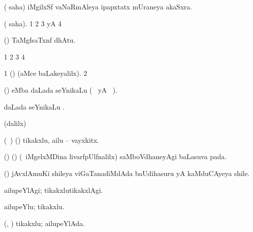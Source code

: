 \bentry
{} 
\gl{\nA}
\bmng
( saha) iMgilxSf vaNaRmAleya ipapxtatx mUraneya akaSxra. 
\emng
\eentry

\bentry
{}
\gl{\saMkiSx}
\expl{}
\bmng
( saha). 
\bnum
\num{1}  
\num{2}  
\num{3}  yA  
\num{4}  
\enum
\emng
\eentry

\bentry
{}
\gl{\saMkeV}
\expl{}
\bmng
(\ravi) TaMgfsaTxnf dhAtu. 
\emng
\eentry

\bentry
{}
\gl{\saMkiSx}
\expl{}
\bmng
\bnum
\num{1}  
\num{2}  
\num{3}  
\num{4}  
\enum
\emng
\eentry


\bentry
{}
\gl{\saMkiSx}
\expl{}
\bmng
\bnum
\num{1} (\ame)  (aMce baLakeyalilx). 
\num{2}  
\enum
\emng
\eentry


\bentry
{} 
\gl{\nA}
\expl{}
\bmng
(\ca)  eMba daLada seYnikaLu (\birx\  yA \ame\ ). 
\emng
\eentry


\bentry
{} 
\gl{\nA}
\expl{}
\bmng
{} daLada seYnikaLu . 
\emng
\eentry

\bentry
{}
\gl{\saMkiSx}
\expl{}
\bmng
(\ame dalilx)  
\emng
\eentry

\bentry
{} 
\gl{\nA}
\expl{}
\bmng
(\kanmu\ \ame) (\ashi) tikakxlu, ailu -- vayxkitx. 
\emng
\eentry

\bentry
{} 
\gl{\nA}
\expl{}
\bmng
(\birx) (\pArxM) (\kanmu\ iMgelxMDina livarfpUlfnalilx) saMboVdhaneyAgi baLasuva pada. 
\emng
\eentry

\bentry
{} 
\gl{\nA}
\expl{}
\bmng
(\ca) jAvxlAmuKi shileya viGaTanadiMdAda baUdihasuru yA kaMduCAyeya shile. 
\emng
\eentry

\bentry
{} 
\gl{\kirxvi}
\expl{}
\bmng
ailupeYlAgi; tikakxlutikakxlAgi. 
\emng
\eentry

\bentry
{} 
\gl{\nA}
\expl{}
\bmng
ailupeYlu; tikakxlu. 
\emng
\eentry

\bentry
{} 
\gl{\gu}
\expl{}
\bmng
(\ame, \ashi) tikakxlu; ailupeYlAda. 
\emng
\eentry

